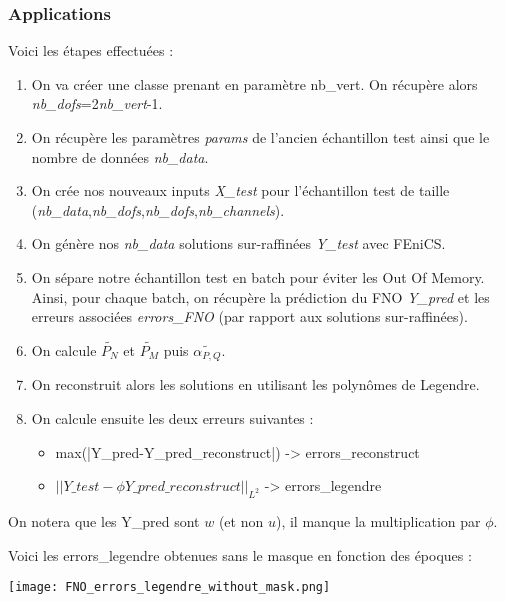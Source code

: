 \subsubsection{Applications}

Voici les étapes effectuées :

\begin{enumerate}[label=\textbullet]
	\item On va créer une classe prenant en paramètre nb\_vert. On récupère alors \textit{nb\_dofs}=2\textit{nb\_vert}-1.
	\item On récupère les paramètres \textit{params} de l'ancien échantillon test ainsi que le nombre de données \textit{nb\_data}.
	\item On crée nos nouveaux inputs \textit{X\_test} pour l'échantillon test de taille (\textit{nb\_data},\textit{nb\_dofs},\textit{nb\_dofs},\textit{nb\_channels}).
	\item On génère nos \textit{nb\_data} solutions sur-raffinées \textit{Y\_test} avec FEniCS.
	\item On sépare notre échantillon test en batch pour éviter les Out Of Memory. Ainsi, pour chaque batch, on récupère la prédiction du FNO \textit{Y\_pred} et les erreurs associées \textit{errors\_FNO} (par rapport aux solutions sur-raffinées).
	\item On calcule $\widetilde{P_N}$ et $\widetilde{P_M}$ puis $\widetilde{\alpha_{P,Q}}$.
	\item On reconstruit alors les solutions en utilisant les polynômes de Legendre.
	\item On calcule ensuite les deux erreurs suivantes :
	\begin{itemize}
		\item max(|Y\_pred-Y\_pred\_reconstruct|) -> errors\_reconstruct
		\item $||Y\_test-\phi Y\_pred\_reconstruct||_{L^2}$  -> errors\_legendre
	\end{itemize}
\end{enumerate}

\begin{Rem}
	On notera que les Y\_pred sont $w$ (et non $u$), il manque la multiplication par $\phi$.
\end{Rem}

Voici les errors\_legendre obtenues sans le masque en fonction des époques :

\begin{minipage}{\linewidth}
	\centering
	\texttt{[image: FNO\_errors\_legendre\_without\_mask.png]}
\end{minipage}

